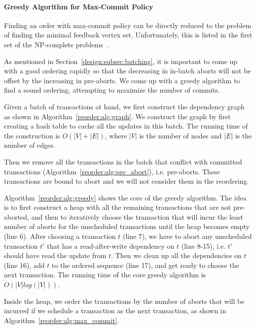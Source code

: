 \paragraph{Greedy Algorithm for Max-Commit Policy}
Finding an order with max-commit policy can be directly reduced to the problem of finding the minimal feedback vertex set. Unfortunately, this is listed in the first set of the NP-complete problems~\cite{karp1972reducibility}.

As mentioned in Section~\ref{design:subsec:batching}, it is important to come up with a good ordering rapidly so that the decreasing in in-batch aborts will not be offset by the increasing in pre-aborts.  We come up with a greedy algorithm to find a sound ordering, attempting to maximize the number of commits.

Given a batch of transactions at hand, we first construct the dependency graph
as shown in Algorithm~\ref{reorder:alg:graph}. We construct the graph by first creating a hash table to cache all the updates in this batch. The running time of the construction is $O(|V|+|E|)$, where $|V|$ is the number of nodes and $|E|$ is the number of edges.

Then we remove all the transactions in the batch that conflict with committed transactions (Algorithm~\ref{reorder:alg:pre_abort}), i.e. pre-aborts. These transactions are bound to abort and we will not consider them in the reordering.

Algorithm~\ref{reorder:alg:greedy} shows the core of the greedy algorithm. 
The idea is to first construct a heap with all the remaining transactions that are not pre-aborted, and then to iteratively choose the transaction that will incur the least number of aborts for the unscheduled transactions until the heap becomes empty (line 6).
After choosing a transaction $t$ (line 7), we have to abort any unscheduled transaction $t'$ that has a read-after-write dependency on $t$ (line 8-15), i.e. $t'$ should have read the update from $t$. 
Then we clean up all the dependencies on $t$ (line 16), add $t$ to the ordered sequence (line 17), and get ready to choose the next transaction.
The running time of the core greedy algorithm is $O(|V|log(|V|))$.

Inside the heap, we order the transactions by the number of aborts that will be incurred if we schedule a transaction as the next transaction, as shown in Algorithm~\ref{reorder:alg:max_commit}. 

